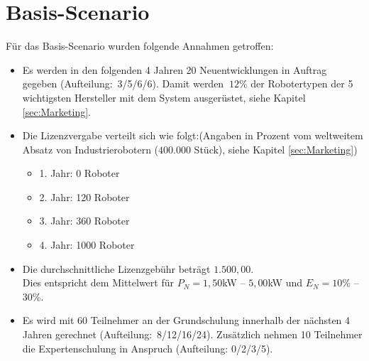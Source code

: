 \section{Basis-Scenario}
Für das Basis-Scenario wurden folgende Annahmen getroffen:
\begin{itemize}
	\item Es werden in den folgenden 4 Jahren 20 Neuentwicklungen in Auftrag gegeben (Aufteilung:~3/5/6/6). Damit werden $~12$\% der Robotertypen der 5 wichtigsten Hersteller mit dem System ausgerüstet, siehe Kapitel \ref{sec:Marketing}.
	\item Die Lizenzvergabe verteilt sich wie folgt:\newline (Angaben in Prozent vom weltweitem Absatz von Industrierobotern ($400.000$ Stück), siehe Kapitel \ref{sec:Marketing})
	\begin{itemize}
		\item 1. Jahr: 0 Roboter
		\item 2. Jahr: 120 Roboter
		\item 3. Jahr: 360 Roboter
		\item 4. Jahr: 1000 Roboter
	\end{itemize}
	\item Die durchschnittliche Lizenzgebühr beträgt $1.500,00$\officialeuro.\\ Dies entspricht dem Mittelwert für $P_N = 1,50$kW -- $5,00$kW und $E_N = 10$\% -- $30$\%.
	\item Es wird mit 60 Teilnehmer an der Grundschulung innerhalb der nächsten 4 Jahren gerechnet (Aufteilung:~8/12/16/24). Zusätzlich nehmen 10 Teilnehmer die Expertenschulung in Anspruch (Aufteilung: 0/2/3/5).
\end{itemize}

\newpage
